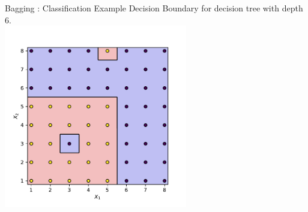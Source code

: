 \documentclass[aspectratio=169,10pt]{beamer}
\newcommand{\fitpic}[1]{\begin{adjustbox}{max width=\linewidth, max totalheight=0.78\textheight}#1\end{adjustbox}}
\begin{document}
\begin{frame}{Bagging : Classification Example}
  Decision Boundary for decision tree with depth 6.\\[0.3cm]
  \centering
  \fitpic{\includegraphics[width=0.6\textwidth]{../assets/ensemble/figures/strong-tree}}
\end{frame}
\end{document}
